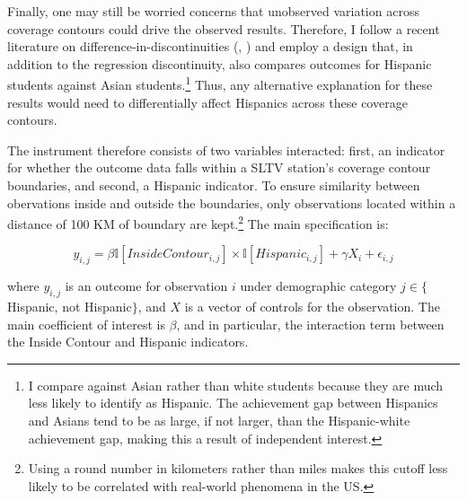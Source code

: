 \documentclass[11pt]{article}
\begin{document}
Finally, one may still be worried concerns that unobserved variation across coverage contours could drive the observed results. Therefore, I follow a recent literature on difference-in-discontinuities (\cite{casas2015women}, \cite{grembi2016fiscal}) and employ a design that, in addition to the regression discontinuity, also compares outcomes for Hispanic students against Asian students.\footnote{I compare against Asian rather than white students because they are much less likely to identify as Hispanic. The achievement gap between Hispanics and Asians tend to be as large, if not larger, than the Hispanic-white achievement gap, making this a result of independent interest.} Thus, any alternative explanation for these results would need to differentially affect Hispanics across these coverage contours.

The instrument therefore consists of two variables interacted: first, an indicator for whether the outcome data falls within a SLTV station's coverage contour boundaries, and second, a Hispanic indicator. To ensure similarity between obervations inside and outside the boundaries, only observations located within a distance of 100 KM of boundary are kept.\footnote{ Using a round number in kilometers rather than miles makes this cutoff less likely to be correlated with real-world phenomena in the US.} The main specification is: 

\[ y_{i,j} =  \beta \mathbb{I}[InsideContour_{i,j}] \times \mathbb{I}[Hispanic_{i,j}] + \gamma X_i + \epsilon_{i,j} \]

where $y_{i,j}$ is an outcome for observation $i$ under demographic category $j \in \{$Hispanic, not Hispanic$\}$, and $X$ is a vector of controls for the observation. The main coefficient of interest is $\beta$, and in particular, the interaction term between the Inside Contour and Hispanic indicators. 

\end{document}
